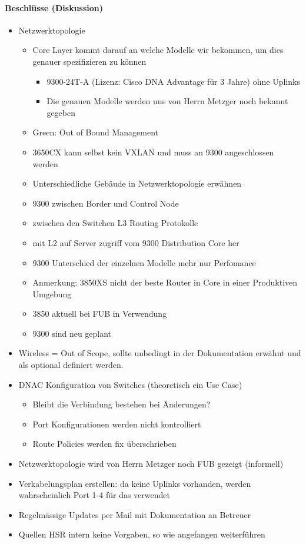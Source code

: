 \paragraph{Beschlüsse (Diskussion)}
\begin{itemize}	
	\item Netzwerktopologie
	\begin{itemize}
		\item Core Layer kommt darauf an welche Modelle wir bekommen, um dies genauer spezifizieren zu können
		\begin{itemize}
			\item 9300-24T-A (Lizenz: Cisco DNA Advantage für 3 Jahre) ohne Uplinks
			\item Die genauen Modelle werden uns von Herrn Metzger noch bekannt gegeben		
		\end{itemize}
		\item Green: Out of Bound Management
		\item 3650CX kann selbst kein VXLAN und muss an 9300 angeschlossen werden
		\item Unterschiedliche Gebäude in Netzwerktopologie erwähnen
		\item 9300 zwischen Border und Control Node
		\item zwischen den Switchen L3 Routing Protokolle
		\item mit L2 auf Server zugriff vom 9300 Distribution Core her
		
		\item 9300 Unterschied der einzelnen Modelle mehr nur Perfomance
		\item Anmerkung: 3850XS nicht der beste Router in Core in einer Produktiven Umgebung
		
		\item 3850 aktuell bei FUB in Verwendung
		\item 9300 sind neu geplant
	\end{itemize}
	\item Wireless = Out of Scope, sollte unbedingt in der Dokumentation erwähnt und als optional definiert werden.
	\item DNAC Konfiguration von Switches (theoretisch ein Use Case)
	\begin{itemize}
		\item Bleibt die Verbindung bestehen bei Änderungen?
		\item Port Konfigurationen werden nicht kontrolliert
		\item Route Policies werden fix überschrieben
	\end{itemize}
	\item Netzwerktopologie wird von Herrn Metzger noch FUB gezeigt (informell)
	\item Verkabelungsplan erstellen: da keine Uplinks vorhanden, werden wahrscheinlich Port 1-4 für das verwendet
	\item Regelmässige Updates per Mail mit Dokumentation an Betreuer
	\item Quellen HSR intern keine Vorgaben, so wie angefangen weiterführen
\end{itemize}

